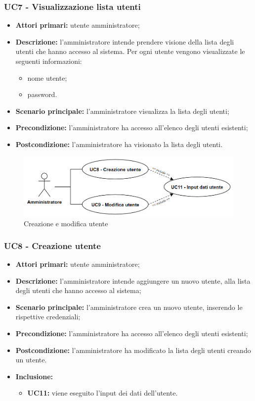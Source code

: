 
\subsubsection{UC7 - Visualizzazione lista utenti}
\begin{itemize}
	\item \textbf{Attori primari:} utente amministratore;
	\item \textbf{Descrizione:} l'amministratore intende prendere visione della lista degli utenti che hanno accesso al sistema. Per ogni utente vengono visualizzate le seguenti informazioni:
		\begin{itemize}
			\item nome utente;
			\item password.
		\end{itemize}
	\item \textbf{Scenario principale:} l'amministratore visualizza la lista degli utenti;
	\item \textbf{Precondizione:} l'amministratore ha accesso all'elenco degli utenti esistenti;
	\item \textbf{Postcondizione:} l'amministratore ha visionato la lista degli utenti.
\end{itemize}

\begin{figure}[h!]
	\centering
	\includegraphics[width=13cm]{images/uc8.png}
	\caption{Creazione e modifica utente}
\end{figure}

\subsubsection{UC8 - Creazione utente}
	\begin{itemize}
		\item \textbf{Attori primari:} utente amministratore;
		\item \textbf{Descrizione:} l'amministratore intende aggiungere un nuovo utente, alla lista degli utenti che hanno accesso al sistema;
		\item \textbf{Scenario principale:} l'amministratore crea un nuovo utente, inserendo le rispettive credenziali;
		\item \textbf{Precondizione:} l'amministratore ha accesso all'elenco degli utenti esistenti;
		\item \textbf{Postcondizione:} l'amministratore ha modificato la lista degli utenti creando un utente.
		\item \textbf{Inclusione:} 
		\begin{itemize}
			\item \textbf{UC11:} viene eseguito l'input dei dati dell'utente.
		\end{itemize}
	\end{itemize}

